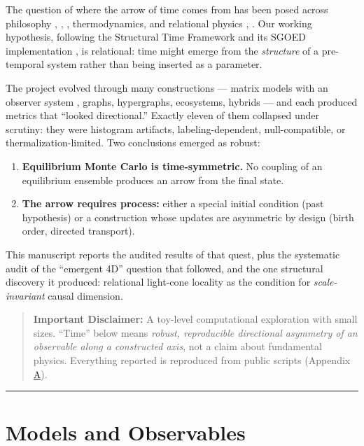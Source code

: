 \documentclass[12pt,a4paper]{article}
\providecommand{\tightlist}{%
  \setlength{\itemsep}{0pt}\setlength{\parskip}{0pt}}
\begin{document}
The question of where the arrow of time comes from has been posed across
philosophy \cite{page_wootters_1983}, \cite{barbour_1999},
\cite{rovelli_2018}, thermodynamics, and relational physics
\cite{connes_rovelli_1994}, \cite{rovelli_rqm_1996}. Our working hypothesis,
following the Structural Time Framework \cite{chanpengpad_stf} and
its SGOED implementation \cite{chanpengpad_sgoed_v2}, is relational: time
might emerge from the \emph{structure} of a pre-temporal system rather
than being inserted as a parameter.

The project evolved through many constructions --- matrix models with an
observer system \cite{chanpengpad_sgoed_v2}, graphs, hypergraphs,
ecosystems, hybrids --- and each produced metrics that ``looked
directional.'' Exactly eleven of them collapsed under scrutiny: they
were histogram artifacts, labeling-dependent, null-compatible, or
thermalization-limited. Two conclusions emerged as robust:

\begin{enumerate}
\def\labelenumi{\arabic{enumi}.}
\tightlist
\item
  \textbf{Equilibrium Monte Carlo is time-symmetric.} No coupling of an
  equilibrium ensemble produces an arrow from the final state.
\item
  \textbf{The arrow requires process:} either a special initial
  condition (past hypothesis) or a construction whose updates are
  asymmetric by design (birth order, directed transport).
\end{enumerate}

This manuscript reports the audited results of that quest, plus the
systematic audit of the ``emergent 4D'' question that followed, and the
one structural discovery it produced: relational light-cone locality as
the condition for \emph{scale-invariant} causal dimension.

\begin{quote}
\textbf{Important Disclaimer:} A toy-level computational exploration
with small sizes. ``Time'' below means \emph{robust, reproducible
directional asymmetry of an observable along a constructed axis}, not a
claim about fundamental physics. Everything reported is reproduced from
public scripts (Appendix \hyperref[appendix-a-reproducibility]{A}).
\end{quote}

\begin{center}\rule{0.5\linewidth}{0.5pt}\end{center}

\section{Models and Observables}\label{models-and-observables}
\end{document}
